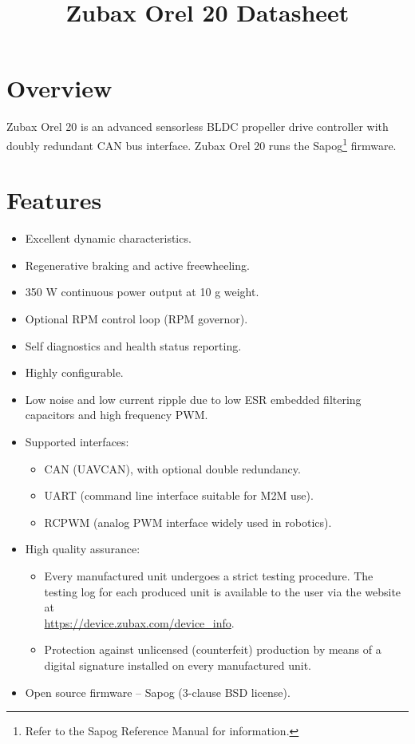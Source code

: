 \documentclass{zubaxdoc}
\title{Zubax Orel 20 Datasheet}
\begin{document}
\frontmatter

\begin{titlepage}

\section*{Overview}

Zubax Orel 20 is an advanced sensorless BLDC propeller drive controller with doubly redundant CAN bus interface.
Zubax Orel 20 runs the Sapog\footnote{Refer to the Sapog Reference Manual for information.}
firmware.

\section*{Features}

\begin{itemize}
    \item Excellent dynamic characteristics.
    \item Regenerative braking and active freewheeling.
    \item 350 W continuous power output at 10 g weight.
    \item Optional RPM control loop (RPM governor).
    \item Self diagnostics and health status reporting.
    \item Highly configurable.
    \item Low noise and low current ripple due to low ESR embedded filtering capacitors and high frequency PWM.
    \item Supported interfaces:
    \begin{itemize}
        \item CAN (UAVCAN), with optional double redundancy.
        \item UART (command line interface suitable for M2M use).
        \item RCPWM (analog PWM interface widely used in robotics).
    \end{itemize}
    \item High quality assurance:
    \begin{itemize}
        \item Every manufactured unit undergoes a strict testing procedure.
        The testing log for each produced unit is available to the user via the website at\\
        \url{https://device.zubax.com/device_info}.
        \item Protection against unlicensed (counterfeit) production by means of a digital signature
        installed on every manufactured unit.
    \end{itemize}
    \item Open source firmware -- Sapog (3-clause BSD license).
\end{itemize}


\end{titlepage}
\end{document}
